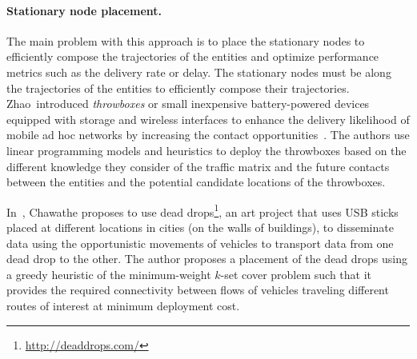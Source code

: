 \paragraph{Stationary node placement.}
The main problem with this approach is to place the stationary nodes to efficiently compose the trajectories of the entities and optimize performance metrics such as the delivery rate or delay. The stationary nodes must be along the trajectories of the entities to efficiently compose their trajectories. Zhao~\etal introduced \textit{throwboxes} or small inexpensive battery-powered devices equipped with storage and wireless interfaces to enhance the delivery likelihood of mobile ad hoc networks by increasing the contact opportunities~\cite{zhao2006capacity}. The authors use linear programming models and heuristics to deploy the throwboxes based on the different knowledge they consider of the traffic matrix and the future contacts between the entities and the potential candidate locations of the throwboxes. 

In~\cite{chawathe2006inter}, Chawathe proposes to use dead drops\footnote{\url{http://deaddrops.com/}}, an art project that uses USB sticks placed at different locations in cities (\eg on the walls of buildings), to disseminate data using the opportunistic movements of vehicles to transport data from one dead drop to the other. The author proposes a placement of the dead drops using a greedy heuristic of the minimum-weight $k$-set cover problem such that it provides the required connectivity between flows of vehicles traveling different routes of interest at minimum deployment cost. 

